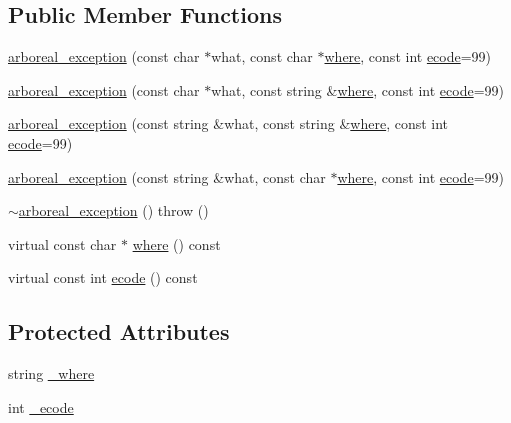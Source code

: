\subsection*{Public Member Functions}
\begin{DoxyCompactItemize}
\item 
\mbox{\hyperlink{classarboreal__exception_a11dbf1da86d3d2b3cfee2f3aeb80117b}{arboreal\+\_\+exception}} (const char $\ast$what, const char $\ast$\mbox{\hyperlink{classarboreal__exception_a802003dee586aaeb0b0d7ce909da2dad}{where}}, const int \mbox{\hyperlink{classarboreal__exception_a318e716601c544d92ff9af25edebd725}{ecode}}=99)
\item 
\mbox{\hyperlink{classarboreal__exception_aa5a71af74c46ffa83716fcdfdb6890e5}{arboreal\+\_\+exception}} (const char $\ast$what, const string \&\mbox{\hyperlink{classarboreal__exception_a802003dee586aaeb0b0d7ce909da2dad}{where}}, const int \mbox{\hyperlink{classarboreal__exception_a318e716601c544d92ff9af25edebd725}{ecode}}=99)
\item 
\mbox{\hyperlink{classarboreal__exception_aa5b64424f94fda27c5a4f48a36a3cb8d}{arboreal\+\_\+exception}} (const string \&what, const string \&\mbox{\hyperlink{classarboreal__exception_a802003dee586aaeb0b0d7ce909da2dad}{where}}, const int \mbox{\hyperlink{classarboreal__exception_a318e716601c544d92ff9af25edebd725}{ecode}}=99)
\item 
\mbox{\hyperlink{classarboreal__exception_a0a289978d3da4e38cae543c936ddc176}{arboreal\+\_\+exception}} (const string \&what, const char $\ast$\mbox{\hyperlink{classarboreal__exception_a802003dee586aaeb0b0d7ce909da2dad}{where}}, const int \mbox{\hyperlink{classarboreal__exception_a318e716601c544d92ff9af25edebd725}{ecode}}=99)
\item 
\mbox{\hyperlink{classarboreal__exception_a05688a6e400e50ecf14bec2f0c717878}{$\sim$arboreal\+\_\+exception}} ()  throw ()
\item 
virtual const char $\ast$ \mbox{\hyperlink{classarboreal__exception_a802003dee586aaeb0b0d7ce909da2dad}{where}} () const
\item 
virtual const int \mbox{\hyperlink{classarboreal__exception_a318e716601c544d92ff9af25edebd725}{ecode}} () const
\end{DoxyCompactItemize}
\subsection*{Protected Attributes}
\begin{DoxyCompactItemize}
\item 
string \mbox{\hyperlink{classarboreal__exception_a73559e45af28b0804b66b04df4c04270}{\+\_\+where}}
\item 
int \mbox{\hyperlink{classarboreal__exception_a4286a73082dc04dd71d8de7c74623a33}{\+\_\+ecode}}
\end{DoxyCompactItemize}


